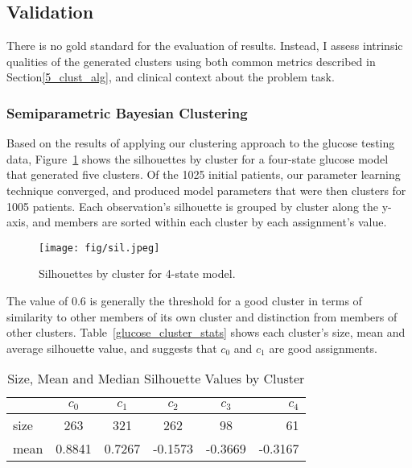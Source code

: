 \subsection{Validation}
There is no gold standard for the evaluation of results.  Instead, I assess intrinsic qualities of the generated clusters using both common metrics described in Section\ref{5_clust_alg}, and clinical context about the problem task.

\subsubsection{Semiparametric Bayesian Clustering}
Based on the results of applying our clustering approach to the glucose testing data, Figure~\ref{sil} shows the silhouettes by cluster for a four-state glucose model that generated five clusters.  Of the 1025 initial patients, our parameter learning technique converged, and produced model parameters that were then clusters for 1005 patients.  Each observation's silhouette is grouped by cluster along the y-axis, and members are sorted within each cluster by each assignment's value.

\begin{figure}
\begin{center}
\centerline{\texttt{[image: fig/sil.jpeg]}}
\caption{Silhouettes by cluster for 4-state model.}
\label{sil}
\end{center}
\vskip -0.2in
\end{figure}

 The value of 0.6 is generally the threshold for a good cluster in terms of similarity to other members of its own cluster and distinction from members of other clusters.  Table~\ref{glucose_cluster_stats} shows each cluster's size, mean and average silhouette value, and suggests that $c_0$ and $c_1$ are good assignments.

 \begin{table}
\caption{Size, Mean and Median Silhouette Values by Cluster}
\label{gluc_stats}
\vskip 0.15in
\begin{center}
\begin{small}
\begin{sc}
\begin{tabular}{lccccr}
\hline
 	&$c_0$ 	&$c_1$	&$c_2$ 	&$c_3$	&$c_4$ \\
\hline
size	&263	&321	&262	&98	&61\\
mean	&0.8841	&0.7267	&-0.1573	&-0.3669	&-0.3167\\
\hline
\end{tabular}
\end{sc}
\end{small}
\end{center}
\vskip -0.1in
\end{table}

